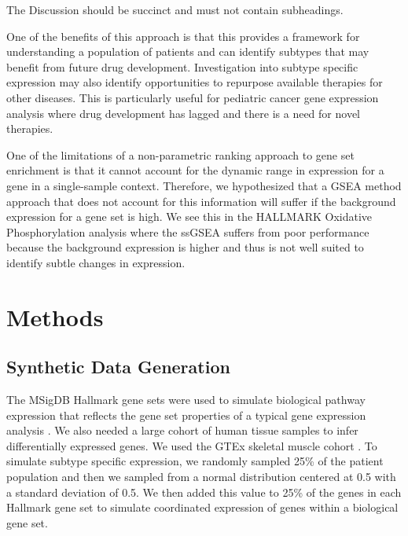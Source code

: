 \documentclass[fleqn,10pt]{wlscirep}
\begin{document}
The Discussion should be succinct and must not contain subheadings.

One of the benefits of this approach is that this provides a framework for understanding a population of patients and can identify subtypes that may benefit from future drug development. Investigation into subtype specific expression may also identify opportunities to repurpose available therapies for other diseases. This is particularly useful for pediatric cancer gene expression analysis where drug development has lagged and there is a need for novel therapies. 

One of the limitations of a non-parametric ranking approach to gene set enrichment is that it cannot account for the dynamic range in expression for a gene in a single-sample context. Therefore, we hypothesized that a GSEA method approach that does not account for this information will suffer if the background expression for a gene set is high. We see this in the HALLMARK Oxidative Phosphorylation analysis where the ssGSEA suffers from poor performance because the background expression is higher and thus is not well suited to identify subtle changes in expression.


\section*{Methods}


\subsection{Synthetic Data Generation}
The MSigDB Hallmark gene sets were used to simulate biological pathway expression that reflects the gene set properties of a typical gene expression analysis \cite{liberzon2015molecular,liberzon2011molecular}. We also needed a large cohort of human tissue samples to infer differentially expressed genes. We used the GTEx skeletal muscle cohort \cite{consortium2013genotype}. To simulate subtype specific expression, we randomly sampled 25\% of the patient population and then we sampled from a normal distribution centered at 0.5 with a standard deviation of 0.5. We then added this value to 25\% of the genes in each Hallmark gene set to simulate coordinated expression of genes within a biological gene set.
\end{document}
